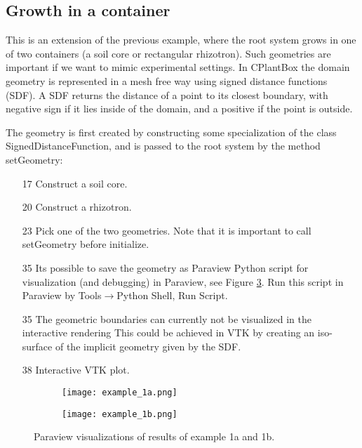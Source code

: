 \subsection{Growth in a container}

This is an extension of the previous example, where the root system grows in one of two containers 
(a soil core or rectangular rhizotron). Such geometries are important if we want to mimic experimental settings. 
In CPlantBox the domain geometry is represented in a mesh free way using signed distance functions (SDF). 
A SDF returns the distance of a point to its closest boundary, with negative sign if it lies inside of the domain, 
and a positive if the point is outside.



The geometry is first created by constructing some specialization of the class SignedDistanceFunction, 
and is passed to the root system by the method setGeometry: 
\begin{itemize}
 \item[17] Construct a soil core. 
 \item[20] Construct a rhizotron.
 \item[23] Pick one of the two geometries. Note that it is important to call setGeometry before initialize.
 \item[35] Its possible to save the geometry as Paraview Python script for visualization (and debugging) in Paraview, 
 see Figure \ref{fig:basicB}. Run this script in Paraview by Tools$\rightarrow$Python Shell, Run Script.
\item[35] The geometric boundaries can currently not be visualized in the interactive rendering 
This could be achieved in VTK by creating an iso-surface of the implicit geometry given by the SDF.
\item[38] Interactive VTK plot. 
\end{itemize}

\begin{figure}
\begin{subfigure}[c]{0.5\textwidth}
\texttt{[image: example\_1a.png]}
 \label{fig:basicA}
\end{subfigure}
\begin{subfigure}[c]{0.5\textwidth}
\texttt{[image: example\_1b.png]}
 \label{fig:basicB}
\end{subfigure}
\caption{Paraview visualizations of results of example 1a and 1b.} 
\end{figure}

